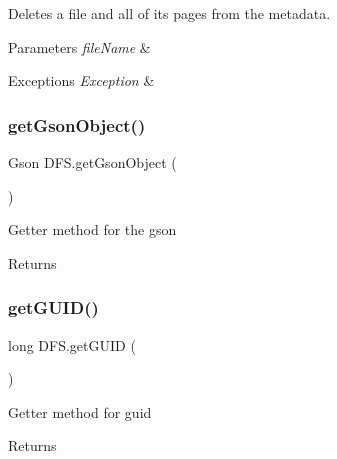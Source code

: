 Deletes a file and all of its pages from the metadata. 
\begin{DoxyParams}{Parameters}
{\em file\+Name} & \\
\hline
\end{DoxyParams}

\begin{DoxyExceptions}{Exceptions}
{\em Exception} & \\
\hline
\end{DoxyExceptions}
\mbox{\label{class_d_f_s_abdcb090af2467b8a2cfe9ab55b3d9cea}} 
\subsubsection{\texorpdfstring{get\+Gson\+Object()}{getGsonObject()}}
{\footnotesize\ttfamily Gson D\+F\+S.\+get\+Gson\+Object (\begin{DoxyParamCaption}{ }\end{DoxyParamCaption})\hspace{0.3cm}{\ttfamily [inline]}}

Getter method for the gson \begin{DoxyReturn}{Returns}

\end{DoxyReturn}
\mbox{\label{class_d_f_s_a95f46c984fa3cdd15c03e60c43e54eac}} 
\subsubsection{\texorpdfstring{get\+G\+U\+I\+D()}{getGUID()}}
{\footnotesize\ttfamily long D\+F\+S.\+get\+G\+U\+ID (\begin{DoxyParamCaption}{ }\end{DoxyParamCaption})\hspace{0.3cm}{\ttfamily [inline]}}

Getter method for guid \begin{DoxyReturn}{Returns}

\end{DoxyReturn}
\mbox{\label{class_d_f_s_a7024a402890d96dc2cbbc05645a869c8}} 

